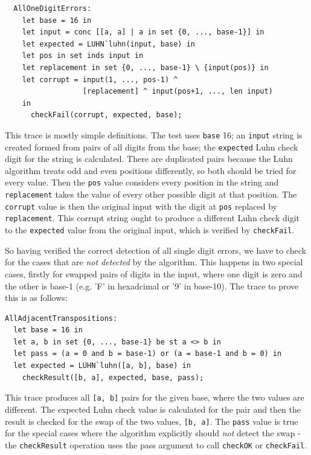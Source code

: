\documentclass{overturerepchap}
\begin{document}
\small
\begin{lstlisting}
  AllOneDigitErrors:
    let base = 16 in
    let input = conc [[a, a] | a in set {0, ..., base-1}] in
    let expected = LUHN`luhn(input, base) in
    let pos in set inds input in
    let replacement in set {0, ..., base-1} \ {input(pos)} in
    let corrupt = input(1, ..., pos-1) ^
                  [replacement] ^ input(pos+1, ..., len input)
    in
      checkFail(corrupt, expected, base);
\end{lstlisting}
\normalsize

\noindent This trace is mostly simple definitions. The test uses \texttt{base}
16; an \texttt{input} string is created formed from pairs of all digits from the base;
the \texttt{expected} Luhn check digit for the string is calculated. There are
duplicated pairs because the Luhn algorithm treats odd and even positions
differently, so both should be tried for every value. Then the \texttt{pos}
value considers every position in the string and \texttt{replacement} takes the
value of every other possible digit at that position. The \texttt{corrupt}
value is then the original input with the digit at \texttt{pos} replaced by
\texttt{replacement}. This corrupt string ought to produce a different Luhn
check digit to the \texttt{expected} value from the original input, which is
verified by \texttt{checkFail}.

So having verified the correct detection of all single digit errors, we have to
check for the cases that are \emph{not detected} by the algorithm. This happens
in two special cases, firstly for swapped pairs of digits in the input, where
one digit is zero and the other is base-1 (e.g. 'F' in hexadcimal or '9' in
base-10). The trace to prove this is as follows:

\small
\begin{lstlisting}
AllAdjacentTranspositions:
  let base = 16 in
  let a, b in set {0, ..., base-1} be st a <> b in
  let pass = (a = 0 and b = base-1) or (a = base-1 and b = 0) in
  let expected = LUHN`luhn([a, b], base) in
    checkResult([b, a], expected, base, pass);
\end{lstlisting}
\normalsize

\noindent This trace produces all \texttt{[a, b]} pairs for the given base,
where the two values are different. The expected Luhn check value is calculated for the pair
and then the result is checked for the swap of the two values, \texttt{[b, a]}.
The \texttt{pass} value is true for the special cases where the algorithm
explicitly should \emph{not} detect the swap - the \texttt{checkResult}
operation uses the pass argument to call \texttt{checkOK} or \texttt{checkFail}.
\end{document}
